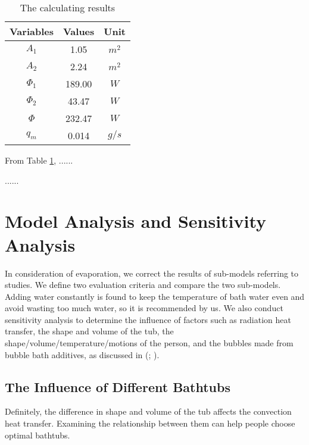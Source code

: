 \documentclass{mcmthesis}
\begin{document}
\begin{table}[h]  %
    \centering        %
    \caption{The calculating results}  %
    \vspace{0.15cm}
    \label{tab2}                       %
    \begin{tabular}{|c|c|c|}  %
        \hline                    %
        Variables & Values & Unit  \\ \hline  %
        $A_1$     & 1.05   & $m^2$ \\ \hline
        $A_2$     & 2.24   & $m^2$ \\ \hline
        $\Phi_1$  & 189.00 & $W$   \\ \hline
        $\Phi_2$  & 43.47  & $W$   \\ \hline
        $\Phi$    & 232.47 & $W$   \\ \hline
        $q_m$     & 0.014  & $g/s$ \\ \hline
    \end{tabular}
\end{table}

From Table \ref{tab2}, ......

......

\section{Model Analysis and Sensitivity Analysis}

In consideration of evaporation, we correct the results of sub-models referring
to studies. We define two evaluation criteria
and compare the two sub-models. Adding water constantly is found to keep the
temperature of bath water even and avoid wasting too much water, so it is
recommended by us. We also conduct sensitivity analysis to determine the
influence of factors such as radiation heat transfer, the shape and volume of
the tub, the shape/volume/temperature/motions of the person, and the bubbles
made from bubble bath additives, as discussed
in (\cite{evaporation2018}; \cite{thesis2015}).

\subsection{The Influence of Different Bathtubs}

Definitely, the difference in shape and volume of the tub affects the
convection heat transfer. Examining the relationship between them can help
people choose optimal bathtubs.
\end{document}
